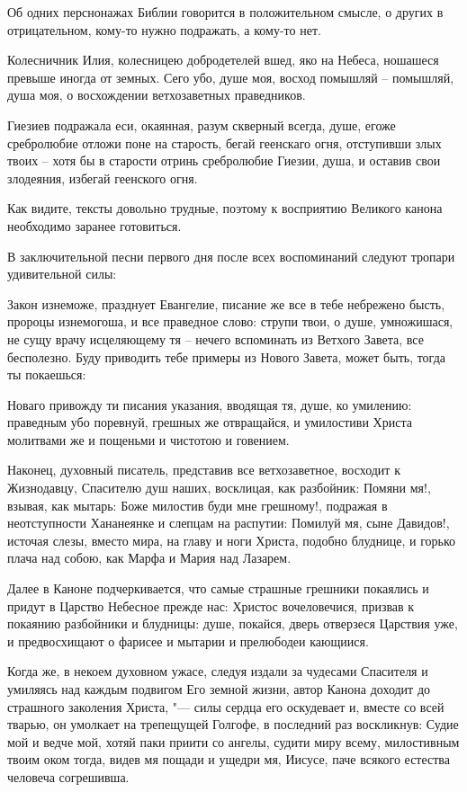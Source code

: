 Об одних перснонажах Библии говорится в положительном смысле, о других в отрицательном, кому-то нужно подражать, а кому-то нет.


Колесничник Илия, колесницею добродетелей вшед, яко на Небеса, ношашеся превыше иногда от земных. Сего убо, душе моя, восход помышляй – помышляй, душа моя, о восхождении ветхозаветных праведников.


Гиезиев подражала еси, окаянная, разум скверный всегда, душе, егоже сребролюбие отложи поне на старость, бегай геенскаго огня, отступивши злых твоих – хотя бы в старости отринь сребролюбие Гиезии, душа, и оставив свои злодеяния, избегай геенского огня.


Как видите, тексты довольно трудные, поэтому к восприятию Великого канона необходимо заранее готовиться.


В заключительной песни первого дня после всех воспоминаний следуют тропари удивительной силы:


Закон изнеможе, празднует Евангелие, писание же все в тебе небрежено бысть, пророцы изнемогоша, и все праведное слово: струпи твои, о душе, умножишася, не сущу врачу исцеляющему тя – нечего вспоминать из Ветхого Завета, все бесполезно. Буду приводить тебе примеры из Нового Завета, может быть, тогда ты покаешься:


Новаго привожду ти писания указания, вводящая тя, душе, ко умилению: праведным убо поревнуй, грешных же отвращайся, и умилостиви Христа молитвами же и пощеньми и чистотою и говением.


Наконец, духовный писатель, представив все ветхозаветное, восходит к Жизнодавцу, Спасителю душ наших, восклицая, как разбойник: Помяни мя!, взывая, как мытарь: Боже милостив буди мне грешному!, подражая в неотступности Хананеянке и слепцам на распутии: Помилуй мя, сыне Давидов!, источая слезы, вместо мира, на главу и ноги Христа, подобно блуднице, и горько плача над собою, как Марфа и Мария над Лазарем.


Далее в Каноне подчеркивается, что самые страшные грешники покаялись и придут в Царство Небесное прежде нас: Христос вочеловечися, призвав к покаянию разбойники и блудницы: душе, покайся, дверь отверзеся Царствия уже, и предвосхищают о фарисее и мытарии и прелюбодеи кающиися.


Когда же, в некоем духовном ужасе, следуя издали за чудесами Спасителя и умиляясь над каждым подвигом Его земной жизни, автор Канона доходит до страшного заколения Христа, "--- силы сердца его оскудевает и, вместе со всей тварью, он умолкает на трепещущей Голгофе, в последний раз воскликнув: Судие мой и ведче мой, хотяй паки приити со ангелы, судити миру всему, милостивным твоим оком тогда, видев мя пощади и ущедри мя, Иисусе, паче всякого естества человеча согрешивша.


